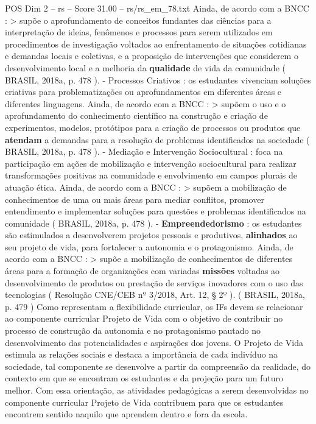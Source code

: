 \begin{textsample}{POS Dim 2 – rs – Score 31.00 – rs/rs\_em\_78.txt}
Ainda, de acordo com a BNCC : > supõe o aprofundamento de conceitos fundantes das ciências para a interpretação de ideias, fenômenos e processos para serem utilizados em procedimentos de investigação voltados ao enfrentamento de situações cotidianas e demandas locais e coletivas, e a proposição de intervenções que considerem o desenvolvimento local e a melhoria da \textbf{qualidade} de vida da comunidade ( BRASIL, 2018a, p. 478 ). - Processos Criativos : os estudantes vivenciam soluções criativas para problematizações ou aprofundamentos em diferentes áreas e diferentes linguagens.
Ainda, de acordo com a BNCC : > supõem o uso e o aprofundamento do conhecimento científico na construção e criação de experimentos, modelos, protótipos para a criação de processos ou produtos que \textbf{atendam} a demandas para a resolução de problemas identificados na sociedade ( BRASIL, 2018a, p. 478 ). - Mediação e Intervenção Sociocultural : foca na participação em ações de mobilização e intervenção sociocultural para realizar transformações positivas na comunidade e envolvimento em campos plurais de atuação ética.
Ainda, de acordo com a BNCC : > supõem a mobilização de conhecimentos de uma ou mais áreas para mediar conflitos, promover entendimento e implementar soluções para questões e problemas identificados na comunidade ( BRASIL, 2018a, p. 478 ). - \textbf{Empreendedorismo} : os estudantes são estimulados a desenvolverem projetos pessoais e produtivos, \textbf{alinhados} ao seu projeto de vida, para fortalecer a autonomia e o protagonismo.
Ainda, de acordo com a BNCC : > supõe a mobilização de conhecimentos de diferentes áreas para a formação de organizações com variadas \textbf{missões} voltadas ao desenvolvimento de produtos ou prestação de serviços inovadores com o uso das tecnologias ( Resolução CNE/CEB nº 3/2018, Art. 12, § 2º ). ( BRASIL, 2018a, p. 479 ) Como representam a flexibilidade curricular, os IFs devem se relacionar ao componente curricular Projeto de Vida com o objetivo de contribuir no processo de construção da autonomia e no protagonismo pautado no desenvolvimento das potencialidades e aspirações dos jovens.
O Projeto de Vida estimula as relações sociais e destaca a importância de cada indivíduo na sociedade, tal componente se desenvolve a partir da compreensão da realidade, do contexto em que se encontram os estudantes e da projeção para um futuro melhor.
Com essa orientação, as atividades pedagógicas a serem desenvolvidas no componente curricular Projeto de Vida contribuem para que os estudantes encontrem sentido naquilo que aprendem dentro e fora da escola.

\end{textsample}
